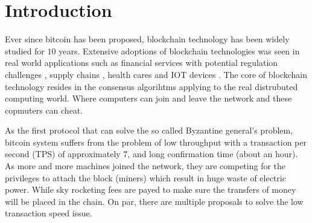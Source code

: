 \section{Introduction}
Ever since bitcoin \cite{nakamoto2008bitcoin} has been proposed, blockchain technology has been widely studied for $10$ years. 
Extensive adoptions of blockchain technologies was seen in real world applications such as 
financial services with potential regulation challenges \cite{michael2018blockchain, tapscott2017blockchain}, 
supply chains \cite{korpela2017digital,tian2016agri, abeyratne2016blockchain}, 
health cares \cite{azaria2016medrec,yue2016healthcare} and IOT devices \cite{christidis2016blockchains}.
The core of blockchain technology resides in the consensus algorihtms applying to the real distrubuted computing world.
Where computers can join and leave the network and these copmuters can cheat.

As the first protocol that can solve the so called Byzantine general's problem, 
bitcoin system suffers from the problem of low throughput with a transaction per second (TPS) of approximately $7$, and long confirmation time (about an hour).
As more and more machines joined the network, they are competing for the privileges to attach the block (miners) which result in huge waste of electric power.
While sky rocketing fees are payed to make sure the transfers of money will be placed in the chain.
On par, there are multiple proposals to solve the low transaction speed issue. 

